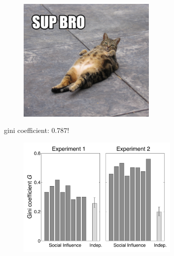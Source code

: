 \documentclass[aspectratio=169]{beamer}
\begin{document}
\begin{frame}

\begin{figure}
  \centering
  \includegraphics[width=0.6\textwidth]{figures/lol_cats_sup_bro}
\end{figure}

\pause 
gini coefficient: 0.787!

\end{frame}
\begin{frame}

\begin{figure}
  \centering
  \includegraphics[width=0.7\textwidth]{figures/compare_gini_v1v2_unordered_ci}
\end{figure}

\end{frame}
\end{document}
